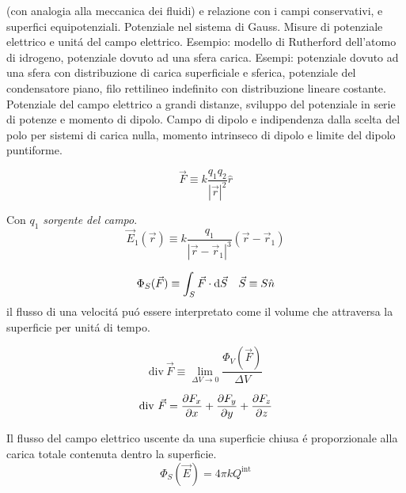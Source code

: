 \begin{multicols}{3}
  (con analogia alla meccanica dei fluidi) e relazione con i campi conservativi, e superfici equipotenziali.
  Potenziale nel sistema di Gauss. Misure di potenziale elettrico e unit\'a del campo elettrico.
  Esempio: modello di Rutherford dell'atomo di idrogeno, potenziale dovuto ad una sfera carica.
  Esempi: potenziale dovuto ad una sfera con distribuzione di carica superficiale e sferica, potenziale del condensatore piano,
  filo rettilineo indefinito con distribuzione lineare costante.
  Potenziale del campo elettrico a grandi distanze, sviluppo del potenziale in serie di potenze e momento di dipolo.
  Campo di dipolo e indipendenza dalla scelta del polo per sistemi di carica nulla, momento intrinseco di dipolo e limite del dipolo puntiforme.
\end{multicols}

\begin{multicols}{3}
  \begin{equation}
    \vec{F} \equiv k \frac{q_1q_2}{|\vec{r}|^2}\hat{r}
  \end{equation}

  Con $q_1$ \textit{sorgente del campo}.
  \begin{equation}
    \vec{E}_1(\vec{r}) \equiv k \frac{q_1}{|\vec{r} - \vec{r}_1|^3}(\vec{r} - \vec{r}_1)
  \end{equation}
  
  \begin{equation}
    \Phi_S(\vec{F}) \equiv \int_S \vec{F} \cdot \text{d}\vec{S} \quad \vec{S} \equiv S\hat{n} \\
  \end{equation}
  il flusso di una velocit\'a pu\'o essere interpretato come il volume che attraversa la superficie per unit\'a di tempo.

  \begin{equation}
    \text{div}~\vec{F} \equiv \lim_{\Delta V \to 0} \frac{\Phi_V(\vec{F})}{\Delta V}
  \end{equation}
  
  \begin{equation}
    \text{div}~\vec{F} = \pdv{F_x}{x} + \pdv{F_y}{y} + \pdv{F_z}{z}
  \end{equation}

  Il flusso del campo elettrico uscente da una superficie chiusa \'e proporzionale alla carica totale contenuta dentro la superficie.
  \begin{equation}
    \Phi_S(\vec{E}) = 4\pi k Q^{\text{int}}
  \end{equation}

\end{multicols}


